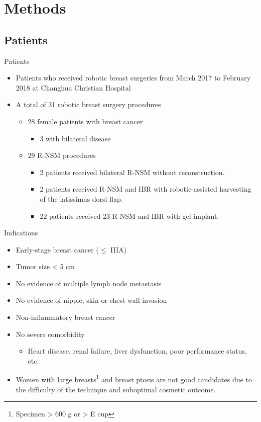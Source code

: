 \documentclass{beamer}
\begin{document}
\section{Methods}
\subsection{Patients}
\begin{frame}{Patients}
    \begin{itemize}
        \item Patients who received robotic breast surgeries from March 2017 to
              February 2018 at Changhua Christian Hospital
        \item A total of 31 robotic breast surgery procedures
            \begin{itemize}
                \item 28 female patients with breast cancer
                    \begin{itemize}
                        \item 3 with bilateral disease
                    \end{itemize}
                \item 29 R-NSM procedures
                    \begin{itemize}
                        \item 2 patients received bilateral R-NSM without reconstruction.
                        \item 2 patients received R-NSM and IBR with robotic-assisted harvesting of the latissimus dorsi flap.
                        \item 22 patients received 23 R-NSM and IBR with gel implant.
                    \end{itemize}
            \end{itemize}
    \end{itemize}
\end{frame}

\begin{frame}{Indications}
    \begin{itemize}
        \item Early-stage breast cancer ($\le$ IIIA)
        \item Tumor size < 5 cm
        \item No evidence of multiple lymph node metastasis
        \item No evidence of nipple, skin or chest wall invasion
        \item Non-inflammatory breast cancer
        \item No severe comorbidity
            \begin{itemize}
                \item Heart disease, renal failure, liver dysfunction, poor performance status, etc.
            \end{itemize}
        \item Women with large breasts\footnote{Specimen > 600 g or > E cup}
              and breast ptosis are not good candidates due to the difficulty
              of the technique and suboptimal cosmetic outcome.
    \end{itemize}
\end{frame}
\end{document}

